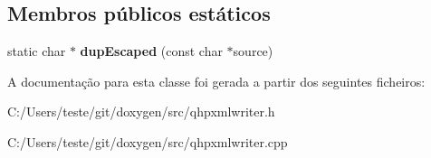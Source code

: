 \subsection*{Membros públicos estáticos}
\begin{DoxyCompactItemize}
\item 
\hypertarget{class_qhp_xml_writer_abf8ee2746a323f2ee69611ebafc90e3b}{static char $\ast$ {\bfseries dup\-Escaped} (const char $\ast$source)}\label{class_qhp_xml_writer_abf8ee2746a323f2ee69611ebafc90e3b}

\end{DoxyCompactItemize}


A documentação para esta classe foi gerada a partir dos seguintes ficheiros\-:\begin{DoxyCompactItemize}
\item 
C\-:/\-Users/teste/git/doxygen/src/qhpxmlwriter.\-h\item 
C\-:/\-Users/teste/git/doxygen/src/qhpxmlwriter.\-cpp\end{DoxyCompactItemize}
